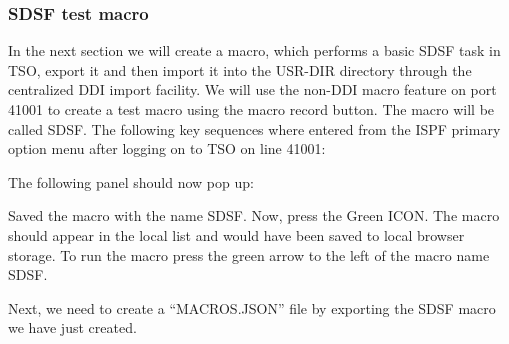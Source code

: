 \documentclass[letterpaper,10pt,english]{sphinxmanual}
\begin{document}
\subsubsection{SDSF test macro}
\label{\detokenize{Customization:sdsf-test-macro}}
In the next section we will create a macro, which performs a basic SDSF task in TSO, export it and then import it into the USR-DIR directory through the centralized DDI import facility. We will use the non-DDI macro feature on port 41001 to create a test macro using the macro record button. The macro will be called SDSF. The following key sequences where entered from the ISPF primary option menu after logging on to TSO on line 41001:

\begin{sphinxVerbatim}[commandchars=\\\{\}]
          
        \PYG{p}{[}      \PYG{p}{]}
                                                          \PYG{p}{]}
                                                   
        
\end{sphinxVerbatim}

The following panel should now pop up:



Saved the macro with the name SDSF. Now, press the Green ICON. The macro should appear in the local list and would have been saved to local browser storage. To run the macro press the green arrow to the left of the macro name SDSF.


Next, we need to create a “MACROS.JSON” file by exporting the SDSF macro we have just created.

\ignorespaces 
\end{document}
